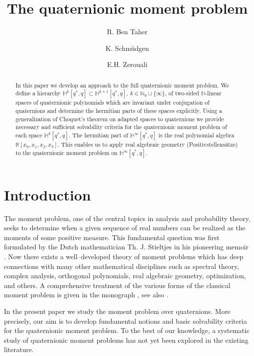 \documentclass[11pt,a4paper]{amsart}
\title{The quaternionic moment problem}
\author{R. Ben Taher}
\author{K. Schm\"udgen}
\author{E.H. Zerouali}
\theoremstyle{definition}
\begin{document}
\begin{abstract}
In this paper we develop an approach to the full quaternionic moment problem.
We define a hierarchy
$ \mathbb{H}^{k}[q^{*}, q]\subset \mathbb{H}^{k+1}[q^{*}, q]$,
$k\in \mathbb{N}_{0}\cup \{\infty \}$, of two-sided $\mathbb{H}$-linear
spaces of quaternionic polynomials which are invariant under conjugation
of quaternions and determine the hermitian parts of these spaces explicitly.
Using a generalization of Choquet's theorem on adapted spaces to quaternions
we provide necessary and sufficient solvability criteria for the quaternionic
moment problem of each space $ \mathbb{H}^{k}[q^{*}, q]$. The hermitian
part of $ \mathbb{H}^{\infty }[q^{*}, q]$ is the real polynomial algebra
$\mathbb{R}[x_{0}, x_{1}, x_{2}, x_{3}]$. This enables us to apply real
algebraic geometry (Positivstellens\"{a}tze) to the quaternionic moment problem
on $ \mathbb{H}^{\infty }[q^{*}, q]$.
\end{abstract}

\maketitle

\section{Introduction}
\label{sec1}

The moment problem, one of the central topics in analysis and probability
theory, seeks to determine when a given sequence of real numbers can be
realized as the moments of some positive measure. This fundamental question
was first formulated by the Dutch mathematician Th. J. Stieltjes in his
pioneering memoir \cite{Stieltjes1894}. Now there exists a well--developed
theory of moment problems which has deep connections with many other mathematical
disciplines such as spectral theory, complex analysis, orthogonal polynomials,
real algebraic geometry, optimization, and others. A comprehensive treatment
of the various forms of the classical moment problem is given in the monograph
\cite{Schmudgen2017}, see also \cite{Akhiezer1965}.

In the present paper we study the moment problem over quaternions. More
precisely, our aim is to develop fundamental notions and basic solvability
criteria for the quaternionic moment problem. To the best of our knowledge,
a systematic study of quaternionic moment problems has not yet been explored
in the existing literature.
\end{document}
